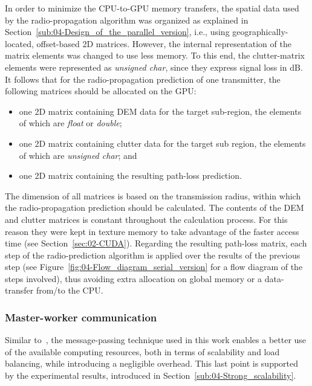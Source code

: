 In order to minimize the CPU-to-GPU memory transfers, the spatial
data used by the radio-propagation algorithm was organized as explained
in Section~\ref{sub:04-Design_of_the_parallel_version}, i.e., using
geographically-located, offset-based 2D matrices. However, the internal
representation of the matrix elements was changed to use less memory.
To this end, the clutter-matrix elements were represented as \emph{unsigned
char}, since they express signal loss in dB. It follows that for the
radio-propagation prediction of one transmitter, the following matrices
should be allocated on the GPU:
\begin{itemize}
\item one 2D matrix containing DEM data for the target sub-region, the elements
of which are \emph{float} or \emph{double}; 
\item one 2D matrix containing clutter data for the target sub region, the
elements of which are \emph{unsigned char}; and
\item one 2D matrix containing the resulting path-loss prediction.
\end{itemize}
The dimension of all matrices is based on the transmission radius,
within which the radio-propagation prediction should be calculated.
The contents of the DEM and clutter matrices is constant throughout
the calculation process. For this reason they were kept in texture
memory to take advantage of the faster access time (see Section~\ref{sec:02-CUDA}).
Regarding the resulting path-loss matrix, each step of the radio-prediction
algorithm is applied over the results of the previous step (see Figure~\ref{fig:04-Flow_diagram_serial_version}
for a flow diagram of the steps involved), thus avoiding extra allocation
on global memory or a data-transfer from/to the CPU.


\subsubsection{Master-worker communication}

Similar to~\cite{Tabik-High_performance_three_horizon_composition_algorithm_for_large_scale_terrains:2011,Tabik-Optimal_tilt_and_orientation_maps_a_multi_algorithm_approach_for_heterogeneous_multicore_GPU_systems:2013},
the message-passing technique used in this work enables a better use
of the available computing resources, both in terms of scalability
and load balancing, while introducing a negligible overhead. This
last point is supported by the experimental results, introduced in
Section~\ref{sub:04-Strong_scalability}.


